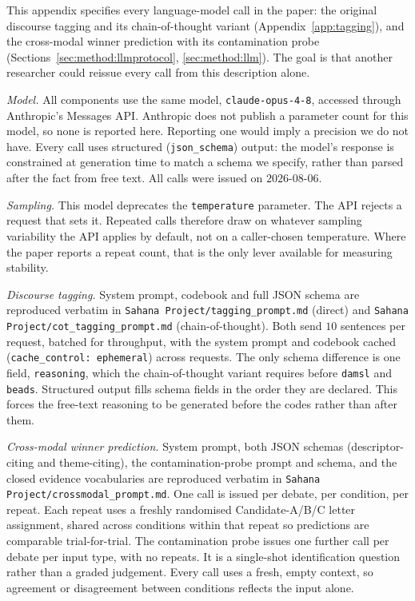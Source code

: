 \documentclass[pdflatex,sn-mathphys-num]{sn-jnl}%
\begin{document}
\begin{appendices}
This appendix specifies every language-model call in the paper: the original
discourse tagging and its chain-of-thought variant (Appendix~\ref{app:tagging}),
and the cross-modal winner prediction with its contamination probe
(Sections~\ref{sec:method:llmprotocol}, \ref{sec:method:llm}). The goal is
that another researcher could reissue every call from this description
alone.

\emph{Model.} All components use the same model, \texttt{claude-opus-4-8},
accessed through Anthropic's Messages API. Anthropic does not publish a
parameter count for this model, so none is reported here. Reporting one
would imply a precision we do not have. Every call uses structured
(\texttt{json\_schema}) output: the model's response is constrained at
generation time to match a schema we specify, rather than parsed after the
fact from free text. All calls were issued on $2026$-$08$-$06$.

\emph{Sampling.} This model deprecates the \texttt{temperature} parameter.
The API rejects a request that sets it. Repeated calls therefore draw on
whatever sampling variability the API applies by default, not on a
caller-chosen temperature. Where the paper reports a repeat count, that is
the only lever available for measuring stability.

\emph{Discourse tagging.} System prompt, codebook and full JSON schema are
reproduced verbatim in \texttt{Sahana Project/tagging\_prompt.md} (direct)
and \texttt{Sahana Project/cot\_tagging\_prompt.md} (chain-of-thought). Both
send $10$ sentences per request, batched for throughput, with the system
prompt and codebook cached (\texttt{cache\_control: ephemeral}) across
requests. The only schema difference is one field, \texttt{reasoning}, which
the chain-of-thought variant requires before \texttt{damsl} and
\texttt{beads}. Structured output fills schema fields in the order they
are declared. This forces the free-text reasoning to be generated before
the codes rather than after them.

\emph{Cross-modal winner prediction.} System prompt, both JSON schemas
(descriptor-citing and theme-citing), the contamination-probe prompt and
schema, and the closed evidence vocabularies are reproduced verbatim in
\texttt{Sahana Project/crossmodal\_prompt.md}. One call is issued per debate,
per condition, per repeat. Each repeat uses a freshly randomised
Candidate-A/B/C letter assignment, shared across conditions within that
repeat so predictions are comparable trial-for-trial. The contamination
probe issues one further call per debate per input type, with no repeats.
It is a single-shot identification question rather than a graded
judgement. Every
call uses a fresh, empty context, so agreement or disagreement between
conditions reflects the input alone.


\end{appendices}
\end{document}
